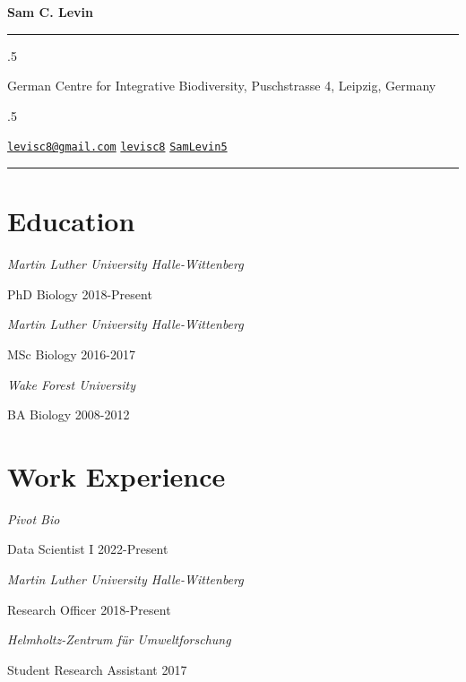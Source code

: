 \documentclass[11pt,]{article}
\begin{document}
\centerline{\huge \bf Sam C. Levin}

\vspace{2 mm}

\hrule

\vspace{2 mm}


\moveleft.5\hoffset\centerline{German Centre for Integrative
Biodiversity, Puschstrasse 4, Leipzig, Germany}
\moveleft.5\hoffset\centerline{ \faEnvelopeO \hspace{1 mm} \href{mailto:}{\tt \href{mailto:levisc8@gmail.com}{\nolinkurl{levisc8@gmail.com}}} \hspace{1 mm}  \faGithub \hspace{1 mm} \href{http://github.com/levisc8}{\tt levisc8} \hspace{1 mm}   \faTwitter \hspace{1 mm} \href{https:/twitter.com/SamLevin5}{\tt SamLevin5} \hspace{1 mm}   }

\vspace{2 mm}

\hrule


\hypertarget{education}{%
\section{Education}\label{education}}

\emph{Martin Luther University Halle-Wittenberg}

PhD Biology \hfill 2018-Present

\emph{Martin Luther University Halle-Wittenberg}

MSc Biology \hfill 2016-2017

\emph{Wake Forest University}

BA Biology \hfill 2008-2012

\hypertarget{work-experience}{%
\section{Work Experience}\label{work-experience}}

\emph{Pivot Bio}

Data Scientist I \hfill 2022-Present

\emph{Martin Luther University Halle-Wittenberg}

Research Officer \hfill 2018-Present

\emph{Helmholtz-Zentrum für Umweltforschung }

Student Research Assistant \hfill 2017
\end{document}
